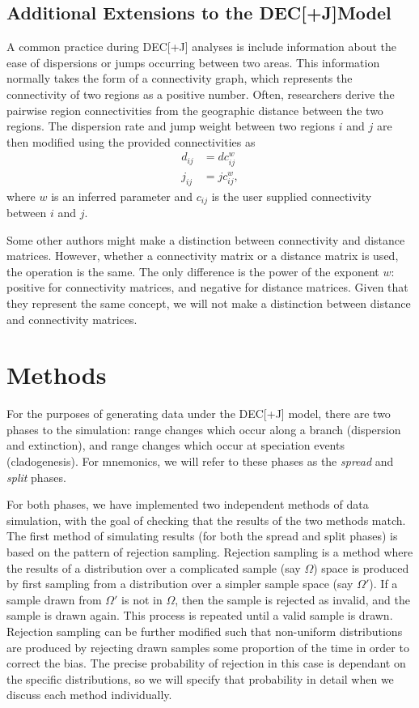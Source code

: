 \documentclass[a4paper]{article}
\newcommand{\decj}{DEC[+J]}
\begin{document}
\subsection{Additional Extensions to the \decj Model}

A common practice during \decj{} analyses is include information about the ease of dispersions or jumps occurring
between two areas.
This information normally takes the form of a connectivity graph, which represents the connectivity of two regions as a
positive number.
Often, researchers derive the pairwise region connectivities from the geographic distance between the two regions.
The dispersion rate and jump weight between two regions $i$ and $j$ are then modified using the provided connectivities
as
\begin{align*}
  d_{ij} &= d c_{ij}^w \\
  j_{ij} &= j c_{ij}^w,
\end{align*}
where $w$ is an inferred parameter and $c_{ij}$ is the user supplied connectivity between $i$ and $j$.

Some other authors might make a distinction between connectivity and distance matrices.
However, whether a connectivity matrix or a distance matrix is used, the operation is the same.
The only difference is the power of the exponent $w$: positive for connectivity matrices, and negative for
distance matrices.
Given that they represent the same concept, we will not make a distinction between distance and connectivity matrices.

\section{Methods}

For the purposes of generating data under the DEC[+J] model, there are two phases to the simulation: range changes which
occur along a branch (dispersion and extinction), and range changes which occur at speciation events (cladogenesis).
For mnemonics, we will refer to these phases as the \textit{spread} and \textit{split} phases.

For both phases, we have implemented two independent methods of data simulation, with the goal of checking that the
results of the two methods match. 
The first method of simulating results (for both the spread and split phases) is based on the pattern of rejection
sampling.
Rejection sampling is a method where the results of a distribution over a complicated sample (say $\Omega$) space is produced by
first sampling from a distribution over a simpler sample space (say $\Omega'$). 
If a sample drawn from $\Omega'$ is not in $\Omega$, then the sample is rejected as invalid, and the sample is drawn
again.
This process is repeated until a valid sample is drawn.
Rejection sampling can be further modified such that non-uniform distributions are produced by rejecting drawn samples
some proportion of the time in order to correct the bias.
The precise probability of rejection in this case is dependant on the specific distributions, so we will specify that
probability in detail when we discuss each method individually.
\end{document}
